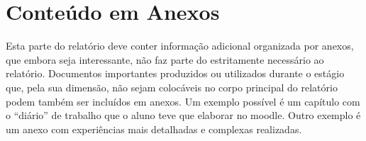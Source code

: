 \chapter{Conteúdo em Anexos}
\label{anexo:A}

Esta parte do relatório deve conter informação adicional organizada por anexos, que embora seja interessante, não faz parte do estritamente necessário ao relatório. Documentos importantes produzidos ou utilizados durante o estágio que, pela sua dimensão, não sejam colocáveis no corpo principal do relatório podem também ser incluídos em anexos.
Um exemplo possível é um capítulo com o “diário” de trabalho que o aluno teve que elaborar no moodle. Outro exemplo é um anexo com experiências mais detalhadas e complexas realizadas.

